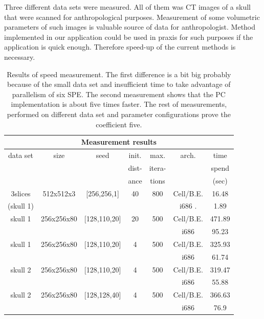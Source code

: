 \par
Three different data sets were measured.
All of them was CT images of a skull that were scanned for anthropological purposes.
Measurement of some volumetric parameters of such images is valuable source of data for anthropologist.
Method implemented in our application could be used in praxis for such purposes if the application is quick enough.
Therefore speed-up of the current methods is necessary.

\begin{table}
\centering
\begin{tabular}{|c|c|c|c|c|c|c|}
\hline
\multicolumn{7}{|c|}{Measurement results}\\
\hline
data set		&size		&seed		&init.		&max. 		&arch.		&time\\
			&		&		&dist-		&itera-		&		&spend\\
			&		&		&ance		&tions		&		&(sec)\\
\hline
\hline
3slices 		&512x512x3	&[256,256,1]	&40		&800		&\mbox{Cell/B.E.}	&16.48\\
(skull 1)		&		&		&		&		&i686	.	&1.89\\
\hline
\hline
skull 1			&256x256x80	&[128,110,20]	&20		&500		&\mbox{Cell/B.E.}	&471.89\\
			&		&		&		&		&i686		&95.23\\
\hline
\hline
skull 1			&256x256x80	&[128,110,20]	&4		&500		&\mbox{Cell/B.E.}	&325.93\\
			&		&		&		&		&i686		&61.74\\
\hline
\hline
skull 2			&256x256x80	&[128,110,20]	&4		&500		&\mbox{Cell/B.E.}	&319.47\\
			&		&		&		&		&i686		&55.88\\
\hline
\hline
skull 2			&256x256x80	&[128,128,40]	&4		&500		&\mbox{Cell/B.E.}	&366.63\\
			&		&		&		&		&i686		&76.9\\
\hline
\end{tabular}
\par
\caption[Measurement results]
{
Results of speed measurement.
The first difference is a bit big probably because of the small data set and insufficient time to take advantage of parallelism of six SPE.
The second measurement shows that the PC implementation is about five times faster.
The rest of measurements, performed on different data set and parameter configurations prove the coefficient five.
}
\label{tab:runresults}
\end{table}

